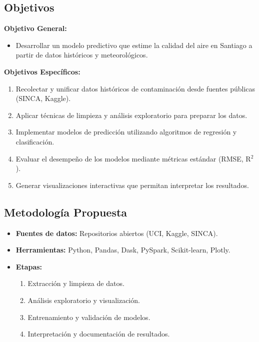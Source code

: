 \documentclass[12pt,a4paper]{article}
\begin{document}
\subsection{Objetivos}

\textbf{Objetivo General:}
\begin{itemize}
    \item Desarrollar un modelo predictivo que estime la calidad del aire en Santiago a partir de datos históricos y meteorológicos.
\end{itemize}

\textbf{Objetivos Específicos:}
\begin{enumerate}
    \item Recolectar y unificar datos históricos de contaminación desde fuentes públicas (SINCA, Kaggle).
    \item Aplicar técnicas de limpieza y análisis exploratorio para preparar los datos.
    \item Implementar modelos de predicción utilizando algoritmos de regresión y clasificación.
    \item Evaluar el desempeño de los modelos mediante métricas estándar (RMSE, R$^2$).
    \item Generar visualizaciones interactivas que permitan interpretar los resultados.
\end{enumerate}

\subsection{Metodología Propuesta}
\begin{itemize}
    \item \textbf{Fuentes de datos:} Repositorios abiertos (UCI, Kaggle, SINCA).
    \item \textbf{Herramientas:} Python, Pandas, Dask, PySpark, Scikit-learn, Plotly.
    \item \textbf{Etapas:}
        \begin{enumerate}
            \item Extracción y limpieza de datos.
            \item Análisis exploratorio y visualización.
            \item Entrenamiento y validación de modelos.
            \item Interpretación y documentación de resultados.
        \end{enumerate}
\end{itemize}
\end{document}

